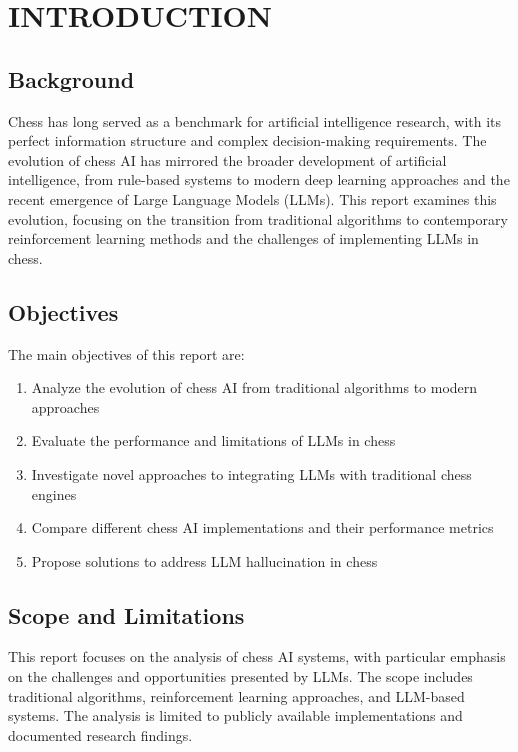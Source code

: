 \documentclass[12pt,a4paper]{report}
\begin{document}
\setcounter{page}{1}

\chapter{INTRODUCTION}

\section{Background}
Chess has long served as a benchmark for artificial intelligence research, with its perfect information structure and complex decision-making requirements. The evolution of chess AI has mirrored the broader development of artificial intelligence, from rule-based systems to modern deep learning approaches and the recent emergence of Large Language Models (LLMs). This report examines this evolution, focusing on the transition from traditional algorithms to contemporary reinforcement learning methods and the challenges of implementing LLMs in chess.

\section{Objectives}
The main objectives of this report are:

\begin{enumerate}
    \item Analyze the evolution of chess AI from traditional algorithms to modern approaches
    \item Evaluate the performance and limitations of LLMs in chess
    \item Investigate novel approaches to integrating LLMs with traditional chess engines
    \item Compare different chess AI implementations and their performance metrics
    \item Propose solutions to address LLM hallucination in chess
\end{enumerate}

\section{Scope and Limitations}
This report focuses on the analysis of chess AI systems, with particular emphasis on the challenges and opportunities presented by LLMs. The scope includes traditional algorithms, reinforcement learning approaches, and LLM-based systems. The analysis is limited to publicly available implementations and documented research findings.
\end{document}
